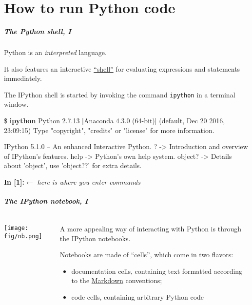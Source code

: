 \documentclass[english,serif,mathserif,xcolor=pdftex,dvipsnames,table]{beamer}
\begin{document}
\part{How to run Python code}

\begin{frame}[fragile]
  \frametitle{The Python shell, I}
  Python is an \emph{interpreted} language.

  \+
  It also features an interactive
  \href{http://en.wikipedia.org/wiki/REPL}{``shell''} for evaluating
  expressions and statements immediately.

  \+
  The IPython shell is started by invoking the command
  \texttt{ipython} in a terminal window.
\begin{semiverbatim}\tiny
\$ \textbf{ipython}
Python 2.7.13 |Anaconda 4.3.0 (64-bit)| (default, Dec 20 2016, 23:09:15)
Type "copyright", "credits" or "license" for more information.

IPython 5.1.0 -- An enhanced Interactive Python.
?         -> Introduction and overview of IPython's features.
help      -> Python's own help system.
object?   -> Details about 'object', use 'object??' for extra details.

\textbf{In [1]:}{\color{blue}\normalfont\em \(\leftarrow\) here is where you enter commands}
\end{semiverbatim}
\end{frame}


\begin{frame}
  \frametitle{The IPython notebook, I}

  \begin{columns}[t]
    \begin{column}{0.5\textwidth}
      \begin{center}
        \texttt{[image: fig/nb.png]}
      \end{center}
    \end{column}
    \begin{column}{0.5\textwidth}
      \small

      A more appealing way of interacting with Python is through the IPython
      notebooks.

      \+
      Notebooks are made of ``cells'', which come in two flavors:
      \begin{itemize}
      \item documentation cells, containing text formatted according to the
        \href{http://commonmark.org/help/}{Markdown} conventions;
      \item code cells, containing arbitrary Python code
      \end{itemize}
    \end{column}
  \end{columns}
\end{frame}
\end{document}
